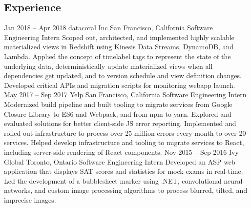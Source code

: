 \documentclass{resume}
\begin{document}
\begin{main}
    \section{Experience}
      \begin{entrylist}
        \rightentry%
          {Jan 2018 -- Apr 2018}%
          {datacoral Inc}%
          {San Francisco, California}%
          {Software Engineering Intern}%
          {\createlist%
            {%
              Scoped out, architected, and implemented highly scalable materialized views in %
              Redshift using Kinesis Data Streams, DynamoDB, and Lambda. %
            }%
            {%
              Applied the concept of timelabel tags to represent the state of the underlying data, %
              deterministically update materialized views when all dependencies get updated, and %
              to version schedule and view definition changes. %
            }%
            {%
              Developed critical APIs and migration scripts for monitoring webapp launch.
            }
          }
        \rightentry%
          {May 2017 -- Sep 2017}%
          {Yelp}%
          {San Francisco, California}%
          {Software Engineering Intern}%
          {\createlist%
            {%
              Modernized build pipeline and built tooling to migrate services from Google Closure %
              Library to ES6 and Webpack, and from npm to yarn. %
            }%
            {%
              Explored and evaluated solutions for better client-side JS error reporting. %
            }%
            {%
              Implemented and rolled out infrastructure to process over 25 million errors every %
              month to over 20 services. %
            }%
            {%
              Helped develop infrastructure and tooling to migrate services to React, including %
              server-side rendering of React components. %
            }%
          }
        \rightentry%
          {Nov 2015 -- Sep 2016}%
          {Ivy Global}%
          {Toronto, Ontario}%
          {Software Engineering Intern}%
          {\createlist%
            {%
              Developed an ASP web application that displays SAT scores and statistics for mock %
              exams in real-time. %
            }%
            {%
              Led the development of a bubblesheet marker using .NET, convolutional neural %
              networks, and custom image processing algorithms to process blurred, tilted, and %
              imprecise images. %
            }%
          }
      \end{entrylist}

\end{main}
\end{document}
